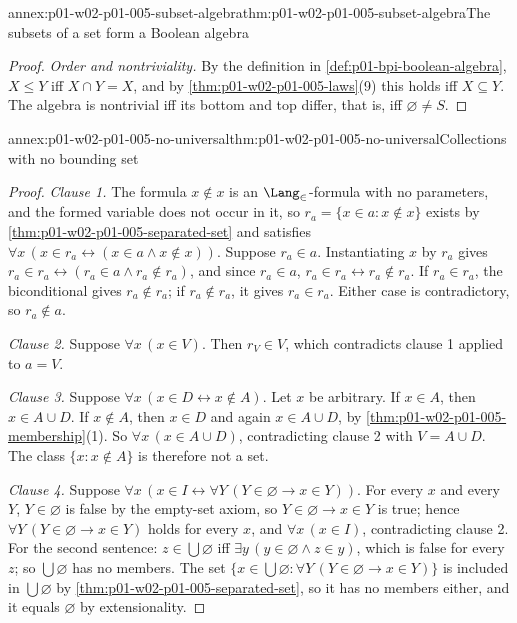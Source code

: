 \begin{annexitem}{annex:p01-w02-p01-005-subset-algebra}{thm:p01-w02-p01-005-subset-algebra}{The subsets of a set form a Boolean algebra}
\begin{proof}
\emph{Order and nontriviality.} By the definition in
\cref{def:p01-bpi-boolean-algebra}, \(X\leq Y\) iff \(X\cap Y=X\), and by
\cref{thm:p01-w02-p01-005-laws}(9) this holds iff \(X\subseteq Y\). The algebra
is nontrivial iff its bottom and top differ, that is, iff
\(\varnothing\neq S\).
\end{proof}
\end{annexitem}

\begin{annexitem}{annex:p01-w02-p01-005-no-universal}{thm:p01-w02-p01-005-no-universal}{Collections with no bounding set}
\begin{proof}
\emph{Clause 1.} The formula \(x\notin x\) is an \(\Lang_{\in}\)-formula with no
parameters, and the formed variable does not occur in it, so
\(r_a=\{x\in a:x\notin x\}\) exists by
\cref{thm:p01-w02-p01-005-separated-set} and satisfies
\(\forall x\,(x\in r_a\leftrightarrow(x\in a\land x\notin x))\). Suppose
\(r_a\in a\). Instantiating \(x\) by \(r_a\) gives
\(r_a\in r_a\leftrightarrow(r_a\in a\land r_a\notin r_a)\), and since
\(r_a\in a\), \(r_a\in r_a\leftrightarrow r_a\notin r_a\). If
\(r_a\in r_a\), the biconditional gives \(r_a\notin r_a\); if
\(r_a\notin r_a\), it gives \(r_a\in r_a\). Either case is contradictory, so
\(r_a\notin a\).

\emph{Clause 2.} Suppose \(\forall x\,(x\in V)\). Then \(r_V\in V\), which
contradicts clause 1 applied to \(a=V\).

\emph{Clause 3.} Suppose \(\forall x\,(x\in D\leftrightarrow x\notin A)\). Let
\(x\) be arbitrary. If \(x\in A\), then \(x\in A\cup D\). If \(x\notin A\),
then \(x\in D\) and again \(x\in A\cup D\), by
\cref{thm:p01-w02-p01-005-membership}(1). So \(\forall x\,(x\in A\cup D)\),
contradicting clause 2 with \(V=A\cup D\). The class \(\{x:x\notin A\}\) is
therefore not a set.

\emph{Clause 4.} Suppose
\(\forall x\,(x\in I\leftrightarrow\forall Y\,(Y\in\varnothing\to x\in Y))\).
For every \(x\) and every \(Y\), \(Y\in\varnothing\) is false by the empty-set
axiom, so \(Y\in\varnothing\to x\in Y\) is true; hence
\(\forall Y\,(Y\in\varnothing\to x\in Y)\) holds for every \(x\), and
\(\forall x\,(x\in I)\), contradicting clause 2. For the second sentence:
\(z\in\bigcup\varnothing\) iff \(\exists y\,(y\in\varnothing\land z\in y)\),
which is false for every \(z\); so \(\bigcup\varnothing\) has no members. The
set \(\{x\in\bigcup\varnothing:\forall Y\,(Y\in\varnothing\to x\in Y)\}\) is
included in \(\bigcup\varnothing\) by
\cref{thm:p01-w02-p01-005-separated-set}, so it has no members either, and it
equals \(\varnothing\) by extensionality.


\end{proof}
\end{annexitem}
